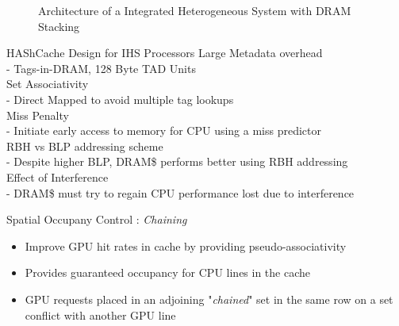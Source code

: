 \documentclass[final,t]{beamer}
\begin{document}
\begin{frame}[t,fragile]{}
\begin{columns}[t]
\begin{column}{.47\linewidth}
    \begin{figure}
        \centering
        \hsacpu
        \caption{Architecture of a Integrated Heterogeneous System with DRAM Stacking}
        \label{fig:hsa-arch}
    \end{figure}
    \begin{exampleblock}{HAShCache Design for IHS Processors}
        \large Large Metadata overhead \\
        \normalsize \qquad- Tags-in-DRAM, 128 Byte TAD Units \\
        \large Set Associativity \\
        \normalsize \qquad- Direct Mapped to avoid multiple tag lookups \\
        \large Miss Penalty \\
        \normalsize \qquad- Initiate early access to memory for CPU using a miss predictor \\
        \large RBH vs BLP addressing scheme \\
        \normalsize \qquad- Despite higher BLP, DRAM\$ performs better using RBH addressing\\
        \large Effect of Interference \\
        \normalsize \qquad- DRAM\$ must try to regain CPU performance lost due to interference\\
    \end{exampleblock}
    
    \begin{exampleblock}{Spatial Occupany Control : \textit{Chaining}}
    \begin{itemize}
	    \item Improve GPU hit rates in cache by providing pseudo-associativity
	    \item Provides guaranteed occupancy for CPU lines in the cache
	    \item GPU requests placed in an adjoining "\textit{chained}" set in the same row on a set conflict with another GPU line
    \end{itemize}
    \end{exampleblock}
    

\end{column}
\end{columns}
\end{frame}
\end{document}
